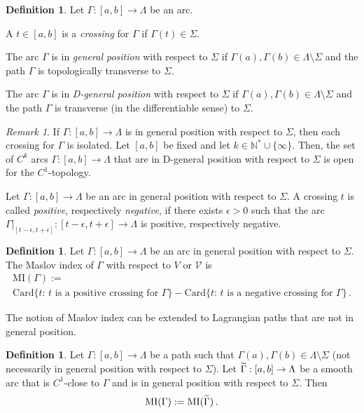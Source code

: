 \documentclass[10pt,a4paper]{amsart}
\numberwithin{equation}{section}
\newcommand*\cV{\mathcal{V}}
\newcommand{\MI}{\mathrm{MI}}
\newcommand{\rCard}{\mathrm{Card}}
\newcommand*\N{\mathbb{N}}
\let\oldtilde\tilde
\renewcommand*{\tilde}[1]{\mathchoice{\widetilde{#1}}{\widetilde{#1}}{\oldtilde{#1}}{\oldtilde{#1}}}
\theoremstyle{definition}
\newtheorem{defi}[theo]{Definition}
\theoremstyle{remark}
\newtheorem{rema}[theo]{Remark}
\begin{document}
\begin{defi}
Let $\Gamma:[a, b]\rightarrow \Lambda$ be an arc.
\begin{itemize}
\item A $t\in[a,b]$ is a {\sl crossing} for $\Gamma$ if $\Gamma(t)\in\Sigma$.
\item The arc $ \Gamma$ is in {\sl general position} with respect to $\Sigma$ if $\Gamma(a),\Gamma(b)\in\Lambda\setminus\Sigma$ and the path $\Gamma$ is { topologically} transverse to $\Sigma$. {
\item The arc $ \Gamma$ is in {\sl D-general position} with respect to $\Sigma$ if $\Gamma(a),\Gamma(b)\in\Lambda\setminus\Sigma$ and the path $\Gamma$ is transverse (in the differentiable sense) to $\Sigma$.}
\end{itemize}
\end{defi}

\begin{rema}
If $\Gamma:[a,b]\to\Lambda$ is in general position with respect to $\Sigma$, then each crossing for $\Gamma$ is isolated. {Let $[a, b]$ be fixed and let $k\in\N^*\cup\{ \infty\}$. Then, the set of $C^k$ arcs $\Gamma:[a, b]\to \Lambda$ that are in D-general position with respect to $\Sigma$ is open for the $C^1$-topology.}
\end{rema}

Let $\Gamma:[a,b]\to\Lambda$ be an arc in general position with respect to $\Sigma$. A crossing $t$ is called \emph{positive}, respectively \emph{negative}, if there exists $\epsilon>0$ such that the arc $\Gamma\vert_{[t-\epsilon, t+\epsilon]}:[t-\epsilon, t+\epsilon]\to\Lambda$ is positive, respectively negative.



\begin{defi}\label{defi MI for arc}
Let $\Gamma:[a,b]\to\Lambda$ be an arc in general position with respect to $\Sigma$. The Maslov index of $\Gamma$ with respect to {$V$ or $\cV$} is
\begin{multline*}
\MI(\Gamma) :=
\\
\rCard\{t :\, t\text{ is a positive crossing for }\Gamma\}-\rCard\{t:\, t \text{ is a negative crossing for }\Gamma\}\,.
\end{multline*}
\end{defi}

The notion of Maslov index can be extended to Lagrangian paths that are not in general position.
\begin{defi}
Let $\Gamma:[a,b]\to\Lambda$ be a path such that $\Gamma(a),\Gamma(b)\in\Lambda\setminus\Sigma$ (not necessarily in general position with respect to $\Sigma$). Let { $\tilde\Gamma:[a,b]\to \Lambda$ be a smooth arc that is $C^1$-close to $\Gamma$ and is in general position with respect to $\Sigma$. } Then
\[
\MI(\Gamma):=\MI(\tilde\Gamma)\,.
\]
\end{defi}
\end{document}
